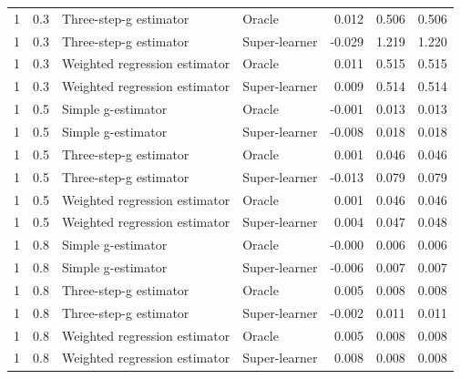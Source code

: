 \documentclass{article}
\begin{document}
\begin{table}[ht]
\begin{tabular}{ll l l r r r}
1 & 0.3 & Three-step-g estimator & Oracle & 0.012 & 0.506 & 0.506 \\
1 & 0.3 & Three-step-g estimator & Super-learner & -0.029 & 1.219 & 1.220 \\
1 & 0.3 & Weighted regression estimator & Oracle & 0.011 & 0.515 & 0.515 \\
1 & 0.3 & Weighted regression estimator & Super-learner & 0.009 & 0.514 & 0.514 \\
1 & 0.5 & Simple g-estimator & Oracle & -0.001 & 0.013 & 0.013 \\
1 & 0.5 & Simple g-estimator & Super-learner & -0.008 & 0.018 & 0.018 \\
1 & 0.5 & Three-step-g estimator & Oracle & 0.001 & 0.046 & 0.046 \\
1 & 0.5 & Three-step-g estimator & Super-learner & -0.013 & 0.079 & 0.079 \\
1 & 0.5 & Weighted regression estimator & Oracle & 0.001 & 0.046 & 0.046 \\
1 & 0.5 & Weighted regression estimator & Super-learner & 0.004 & 0.047 & 0.048 \\
1 & 0.8 & Simple g-estimator & Oracle & -0.000 & 0.006 & 0.006 \\
1 & 0.8 & Simple g-estimator & Super-learner & -0.006 & 0.007 & 0.007 \\
1 & 0.8 & Three-step-g estimator & Oracle & 0.005 & 0.008 & 0.008 \\
1 & 0.8 & Three-step-g estimator & Super-learner & -0.002 & 0.011 & 0.011 \\
1 & 0.8 & Weighted regression estimator & Oracle & 0.005 & 0.008 & 0.008 \\
1 & 0.8 & Weighted regression estimator & Super-learner & 0.008 & 0.008 & 0.008 \\
\bottomrule
\end{tabular}
\end{table}
\end{document}

